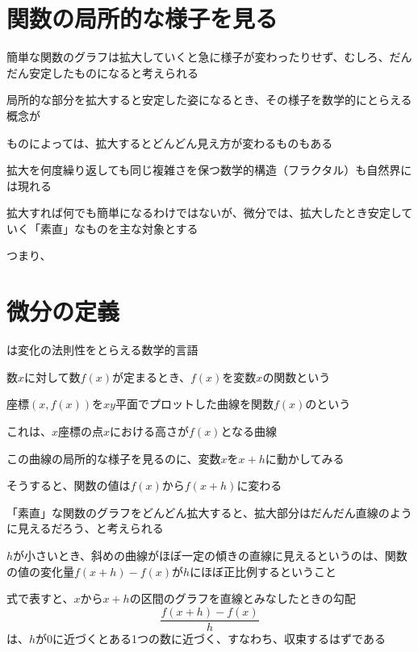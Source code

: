 \documentclass[../book_jiriki_calc]{subfiles}
\begin{document}
\section{関数の局所的な様子を見る}

簡単な関数のグラフは拡大していくと急に様子が変わったりせず、むしろ、だんだん安定したものになると考えられる

局所的な部分を拡大すると安定した姿になるとき、その様子を数学的にとらえる概念が

\br

ものによっては、拡大するとどんどん見え方が変わるものもある

拡大を何度繰り返しても同じ複雑さを保つ数学的構造（フラクタル）も自然界には現れる

\br

拡大すれば何でも簡単になるわけではないが、微分では、拡大したとき安定していく「素直」なものを主な対象とする

つまり、

\section{微分の定義}

は変化の法則性をとらえる数学的言語

数$x$に対して数$f(x)$が定まるとき、$f(x)$を変数$x$の関数という

\sectionline

座標$(x,f(x))$を$xy$平面でプロットした曲線を関数$f(x)$のという

これは、$x$座標の点$x$における高さが$f(x)$となる曲線

\sectionline

この曲線の局所的な様子を見るのに、変数$x$を$x+h$に動かしてみる

そうすると、関数の値は$f(x)$から$f(x+h)$に変わる

\br

「素直」な関数のグラフをどんどん拡大すると、拡大部分はだんだん直線のように見えるだろう、と考えられる

$h$が小さいとき、斜めの曲線がほぼ一定の傾きの直線に見えるというのは、関数の値の変化量$f(x+h)-f(x)$が$h$にほぼ正比例するということ

\br

式で表すと、$x$から$x+h$の区間のグラフを直線とみなしたときの勾配
\begin{equation}
  \dfrac{f(x+h)-f(x)}{h}
\end{equation}
は、$h$が$0$に近づくとある1つの数に近づく、すなわち、収束するはずである
\end{document}
